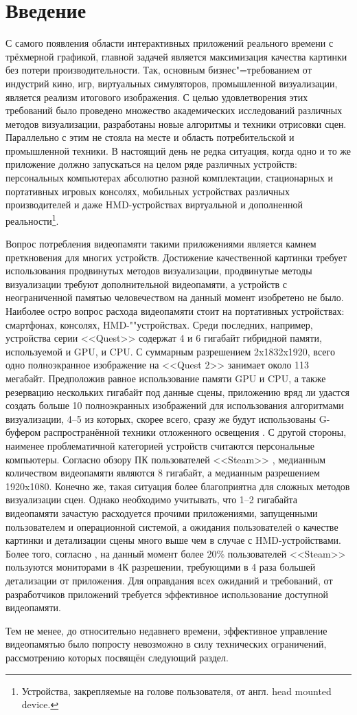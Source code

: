 \section{Введение}
С самого появления области интерактивных приложений реального времени с трёхмерной графикой, главной задачей является максимизация качества картинки без потери производительности.
Так, основным бизнес"=требованием от индустрий кино, игр, виртуальных симуляторов, промышленной визуализации, является реализм итогового изображения.
С целью удовлетворения этих требований было проведено множество академических исследований различных методов визуализации, разработаны новые алгоритмы и техники отрисовки сцен.
Параллельно с этим не стояла на месте и область потребительской и промышленной техники.
В настоящий день не редка ситуация, когда одно и то же приложение должно запускаться на целом ряде различных устройств: персональных компьютерах абсолютно разной комплектации, стационарных и портативных игровых консолях, мобильных устройствах различных производителей и даже HMD-устройствах виртуальной и дополненной реальности\footnote{Устройства, закрепляемые на голове пользователя, от англ. head mounted device.}.

Вопрос потребления видеопамяти такими приложениями является камнем преткновения для многих устройств.
Достижение качественной картинки требует использования продвинутых методов визуализации, продвинутые методы визуализации требуют дополнительной видеопамяти, а устройств с неограниченной памятью человечеством на данный момент изобретено не было.
Наиболее остро вопрос расхода видеопамяти стоит на портативных устройствах: смартфонах, консолях, HMD-""устройствах.
Среди последних, например, устройства серии <<Quest>> содержат 4 и 6 гигабайт гибридной памяти, используемой и GPU, и CPU.
С суммарным разрешением 2x1832x1920, всего одно полноэкранное изображение на <<Quest 2>> занимает около 113 мегабайт.
Предположив равное использование памяти GPU и CPU, а также резервацию нескольких гигабайт под данные сцены, приложению вряд ли удастся создать больше 10 полноэкранных изображений для использования алгоритмами визуализации, 4--5 из которых, скорее всего, сразу же будут использованы G-буфером распространённой техники отложенного освещения \cite{10.1145/54852.378468}.
С другой стороны, наименее проблематичной категорией устройств считаются персональные компьютеры. Согласно обзору ПК пользователей <<Steam>> \cite{steamSurvey2023may}, медианным количеством видеопамяти являются 8 гигабайт, а медианным разрешением 1920x1080. Конечно же, такая ситуация более благоприятна для сложных методов визуализации сцен. Однако необходимо учитывать, что 1--2 гигабайта видеопамяти зачастую расходуется прочими приложениями, запущенными пользователем и операционной системой, а ожидания пользователей о качестве картинки и детализации сцены много выше чем в случае с HMD-устройствами. Более того, согласно \cite{steamSurvey2023may}, на данный момент более 20\% пользователей <<Steam>> пользуются мониторами в 4К разрешении, требующими в 4 раза большей детализации от приложения. Для оправдания всех ожиданий и требований, от разработчиков приложений требуется эффективное использование доступной видеопамяти.

Тем не менее, до относительно недавнего времени, эффективное управление видеопамятью было попросту невозможно в силу технических ограничений, рассмотрению которых посвящён следующий раздел.
